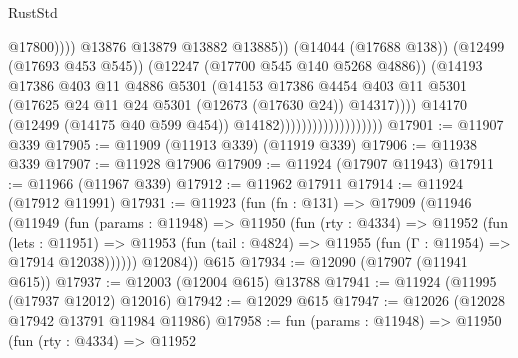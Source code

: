 \begin{lexlean}{RustStd}
\begin{coremodule}
                                                        @17800))))
                                                @13876
                                                @13879
                                                @13882
                                                @13885))
                                            (@14044 (@17688 @138))
                                            (@12499 (@17693 @453 @545))
                                            (@12247 (@17700 @545 @140 @5268 @4886))
                                            (@14193
                                              @17386
                                              @403
                                              @11
                                              @4886
                                              @5301
                                              (@14153
                                                @17386
                                                @4454
                                                @403
                                                @11
                                                @5301
                                                (@17625
                                                  @24
                                                  @11
                                                  @24
                                                  @5301
                                                  (@12673 (@17630 @24))
                                                  @14317))))
                                          @14170
                                          (@12499 (@14175 @40 @599 @454))
                                          @14182)))))))))))))))))))
@17901 := @11907 @339
@17905 := @11909 (@11913 @339) (@11919 @339)
@17906 := @11938 @339
@17907 := @11928 @17906
@17909 := @11924 (@17907 @11943)
@17911 := @11966 (@11967 @339)
@17912 := @11962 @17911
@17914 := @11924 (@17912 @11991)
@17931 := @11923
    (fun (fn : @131) =>
    @17909
      (@11946
        (@11949
          (fun (params : @11948) =>
          @11950
            (fun (rty : @4334) =>
            @11952
              (fun (lets : @11951) =>
              @11953 (fun (tail : @4824) => @11955 (fun (Γ : @11954) => @17914 @12038))))))
        @12084))
    @615
@17934 := @12090 (@17907 (@11941 @615))
@17937 := @12003 (@12004 @615) @13788
@17941 := @11924 (@11995 (@17937 @12012) @12016)
@17942 := @12029 @615
@17947 := @12026 (@12028 @17942 @13791 @11984 @11986)
@17958 := fun (params : @11948) =>
  @11950
    (fun (rty : @4334) =>
    @11952

\end{coremodule}
\end{lexlean}
